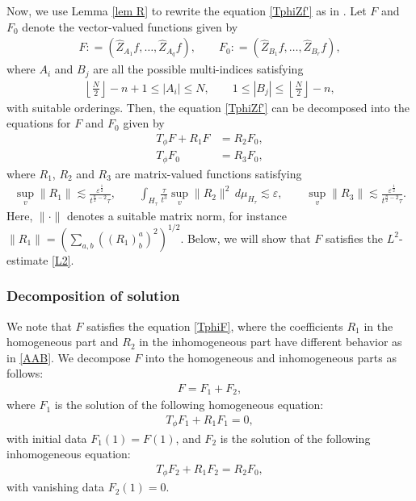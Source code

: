 \documentclass{article}
\begin{document}
Now, we use Lemma \ref{lem R} to rewrite the equation \eqref{TphiZf'} as in \cite{FJS17}. Let $ F $ and $ F_0 $ denote the vector-valued functions given by
\begin{align*}
F : = \left( \hat{ Z }_{ A_1 } f , \dots , \hat{ Z }_{ A_q } f \right) , \qquad F_0 : = \left( \hat{ Z }_{ B_{ 1 } } f , \dots , \hat{ Z }_{ B_r } f \right) ,
\end{align*}
where $ A_i $ and $ B_j $ are all the possible multi-indices satisfying
\begin{align*}
\left\lfloor \frac{ N }{ 2 } \right\rfloor - n + 1 \leq | A_i | \leq N , \qquad 1 \leq | B_j | \leq \left\lfloor \frac{ N }{ 2 } \right\rfloor - n ,
\end{align*}
with suitable orderings. Then, the equation \eqref{TphiZf'} can be decomposed into the equations for $ F $ and $ F_0 $ given by
\begin{align}
T_\phi F + R_1 F & = R_2 F_0 , \label{TphiF} \\
T_\phi F_0 & = R_3 F_0 , \label{TphiL}
\end{align}
where $ R_1 $, $ R_2 $ and $ R_3 $ are matrix-valued functions satisfying
\begin{align}
\sup_v \| R_1 \| \lesssim \frac{ \varepsilon^{ \frac{ 1 }{ 2 } } }{ t^{ \frac{ n }{ 2 } - 2 } \tau } , \qquad \int_{ H_\tau } \frac{ \tau }{ t^3 } \sup_v \| R_2 \|^2 \, d \mu_{ H_\tau } \lesssim \varepsilon , \qquad \sup_v \| R_3 \| \lesssim \frac{ \varepsilon^{ \frac{ 1 }{ 2 } } }{ t^{ \frac{ n }{ 2 } - 2 } \tau } . \label{AAB}
\end{align}
Here, $ \| \cdot \| $ denotes a suitable matrix norm, for instance $ \| R_1 \| = \left( \sum_{ a , b } ( ( R_1 )^a_b )^2 \right)^{ 1 / 2 } $. Below, we will show that $ F $ satisfies the $ L^2 $-estimate \eqref{L2}.



%
\subsubsection{Decomposition of solution}
We note that $ F $ satisfies the equation \eqref{TphiF}, where the coefficients $ R_1 $ in the homogeneous part and $ R_2 $ in the inhomogeneous part have different behavior as in \eqref{AAB}. We decompose $ F $ into the homogeneous and inhomogeneous parts as follows:
\begin{align*}
F = F_1 + F_2 ,
\end{align*}
where $ F_1 $ is the solution of the following homogeneous equation:
\begin{align} \label{TphiH}
T_\phi F_1 + R_1 F_1 = 0 ,
\end{align}
with initial data $ F_1 ( 1 ) = F ( 1 ) $, and $ F_2 $ is the solution of the following inhomogeneous equation:
\begin{align} \label{TphiI}
T_\phi F_2 + R_1 F_2 = R_2 F_0 ,
\end{align}
with vanishing data $ F_2 ( 1 ) = 0 $.
\end{document}
